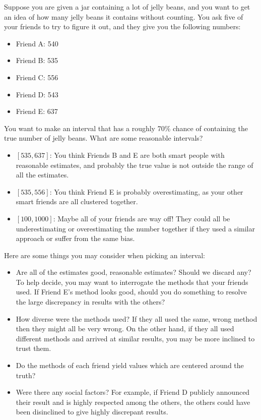 \documentclass[letterpaper,12pt]{article}
\begin{document}
Suppose you are given a jar containing a lot of jelly beans, and you want to get an idea of how many jelly beans it contains without counting. You ask five of your friends to try to figure it out, and they give you the following numbers:

\begin{itemize}

\item
  Friend A: 540
\item
  Friend B: 535
\item
  Friend C: 556
\item
  Friend D: 543
\item
  Friend E: 637
\end{itemize}

You want to make an interval that has a roughly 70\% chance of containing the true number of jelly beans. What are some reasonable intervals?

\begin{itemize}

\item
  $[535, 637]$: You think Friends B and E are both smart people with reasonable estimates, and probably the true value is not outside the range of all the estimates.
\item
  $[535, 556]$: You think Friend E is probably overestimating, as your other smart friends are all clustered together.
\item
  $[100, 1000]$: Maybe all of your friends are way off! They could all be underestimating or overestimating the number together if they used a similar approach or suffer from the same bias.
\end{itemize}

Here are some things you may consider when picking an interval:

\begin{itemize}

\item
  Are all of the estimates good, reasonable estimates? Should we discard any? To help decide, you may want to interrogate the methods that your friends used. If Friend E's method looks good, should you do something to resolve the large discrepancy in results with the others?
\item
  How diverse were the methods used? If they all used the same, wrong method then they might all be very wrong. On the other hand, if they all used different methods and arrived at similar results, you may be more inclined to trust them.
\item
  Do the methods of each friend yield values which are centered around the truth?
\item
  Were there any social factors? For example, if Friend D publicly announced their result and is highly respected among the others, the others could have been disinclined to give highly discrepant results.
\end{itemize}
\end{document}
